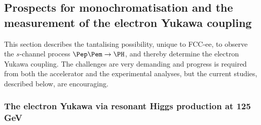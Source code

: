 \subsection{Prospects for monochromatisation and the measurement of the electron Yukawa coupling}
\label{sec:eYukawa}

This section describes the tantalising possibility, unique to FCC-ee, 
to observe the $s$-channel process $\Pep\Pem \to \PH$, and thereby determine the electron Yukawa coupling.  
The challenges are very demanding and progress is required from both the accelerator and the experimental analyses, but the current studies, described below, are encouraging.

\subsubsection*{The electron Yukawa via resonant Higgs production at 125\,GeV}

